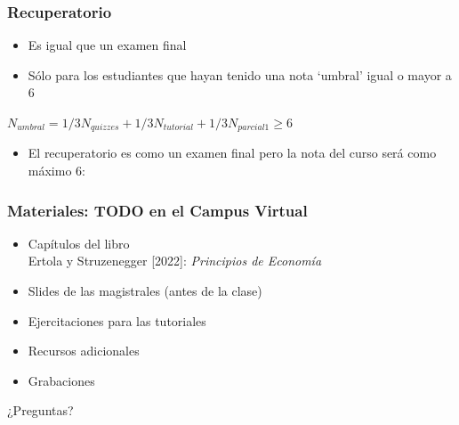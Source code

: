 \documentclass{beamer}
\begin{document}
\begin{frame}
\frametitle{Recuperatorio}
\begin{itemize}
    \item Es igual que un examen final \vspace{2mm}
    \item Sólo para los estudiantes que hayan tenido una nota ‘umbral’ igual o mayor a 6
\end{itemize}
    \begin{center}
     $N_{umbral}=1/3N_{quizzes}+1/3N_{tutorial}+1/3N_{parcial 1} \geq 6$   
    \end{center}
\begin{itemize} \vspace{2mm}
    \item El recuperatorio es como un examen final pero la nota del curso será como máximo 6:
\end{itemize}
\end{frame}

\begin{frame}
\frametitle{Materiales: TODO en el Campus Virtual}
\begin{itemize}
    \item Capítulos del libro \vspace{2mm}  \\
    Ertola y Struzenegger [2022]:  \textit{Principios de Economía} \vspace{2mm} 
    \item Slides de las magistrales (antes de la clase) \vspace{2mm}
    \item Ejercitaciones para las tutoriales \vspace{2mm}
    \item Recursos adicionales \vspace{2mm}
    \item Grabaciones \vspace{2mm}
\end{itemize}
\end{frame}

\begin{frame}
\begin{center}
    \Huge ¿Preguntas?
\end{center}
\end{frame}
\end{document}
